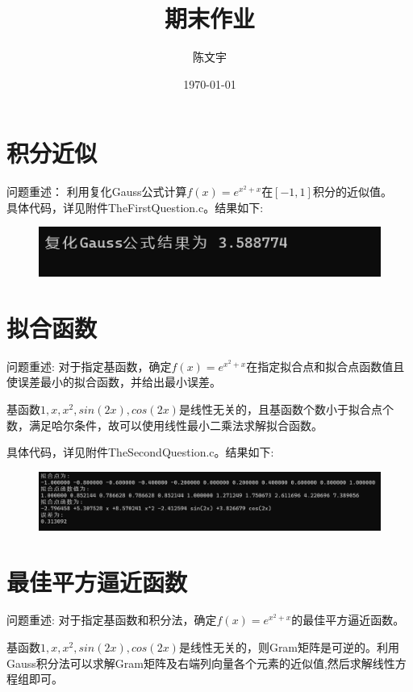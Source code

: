 \documentclass[UTF8]{ctexart}
\begin{document}
\title{期末作业}
%
\author{陈文宇}

\date{\today}

\maketitle{}


\section{积分近似}
问题重述：
利用复化Gauss公式计算$f(x)=e^{x^{2}+x}$在$[-1,1]$积分的近似值。\\
具体代码，详见附件TheFirstQuestion.c。结果如下:
\begin{figure}[h!]
	\centering
	\includegraphics[scale=0.6]{Pic1.png}
\end{figure}

\section{拟合函数}
问题重述:
对于指定基函数，确定$f(x)=e^{x^{2}+x}$在指定拟合点和拟合点函数值且使误差最小的拟合函数，并给出最小误差。

基函数$1,x,x^{2},sin(2x),cos(2x)$是线性无关的，且基函数个数小于拟合点个数，满足哈尔条件，故可以使用线性最小二乘法求解拟合函数。

具体代码，详见附件TheSecondQuestion.c。结果如下:

\begin{figure}[h!]
	\centering
	\includegraphics[scale=0.4]{Pic2.png}
\end{figure}

\section{最佳平方逼近函数}
问题重述:
对于指定基函数和积分法，确定$f(x)=e^{x^{2}+x}$的最佳平方逼近函数。

基函数$1,x,x^{2},sin(2x),cos(2x)$是线性无关的，则Gram矩阵是可逆的。利用Gauss积分法可以求解Gram矩阵及右端列向量各个元素的近似值,然后求解线性方程组即可。
\end{document}
